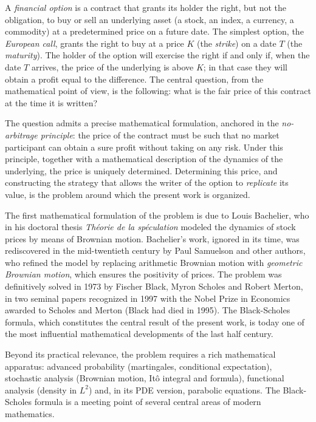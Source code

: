 \documentclass[11pt,a4paper,oneside]{report}
\theoremstyle{plain}
\theoremstyle{definition}
\theoremstyle{remark}
\newcommand{\1}{\mathbf{1}}
\begin{document}
A \emph{financial option} is a contract that grants its holder the
right, but not the obligation, to buy or sell an underlying asset (a
stock, an index, a currency, a commodity) at a predetermined price on
a future date. The simplest option, the \emph{European call}, grants
the right to buy at a price $K$ (the \emph{strike}) on a date $T$
(the \emph{maturity}). The holder of the option will exercise the
right if and only if, when the date $T$ arrives, the price of the
underlying is above $K$; in that case they will obtain a profit equal
to the difference. The central question, from the mathematical point
of view, is the following: what is the fair price of this contract at
the time it is written?

The question admits a precise mathematical formulation, anchored in
the \emph{no-arbitrage principle}: the price of the contract must be
such that no market participant can obtain a sure profit without
taking on any risk. Under this principle, together with a
mathematical description of the dynamics of the underlying, the price
is uniquely determined. Determining this price, and constructing the
strategy that allows the writer of the option to \emph{replicate} its
value, is the problem around which the present work is organized.

The first mathematical formulation
of the problem is due to Louis Bachelier, who in his doctoral thesis
\emph{Théorie de la spéculation} \cite{bachelier} modeled the
dynamics of stock prices by means of Brownian motion. Bachelier's
work, ignored in its time, was rediscovered in the mid-twentieth
century by Paul Samuelson and other authors, who refined the model by
replacing arithmetic Brownian motion with \emph{geometric Brownian
motion}, which ensures the positivity of prices. The problem was
definitively solved in 1973 by Fischer Black, Myron Scholes and
Robert Merton, in two seminal papers \cite{black-scholes,merton}
recognized in 1997 with the Nobel Prize in Economics awarded to
Scholes and Merton (Black had died in 1995). The Black-Scholes
formula, which constitutes the central result of the present work, is
today one of the most influential mathematical developments of the
last half century.

Beyond its
practical relevance, the problem requires a rich mathematical
apparatus: advanced probability (martingales, conditional
expectation), stochastic analysis (Brownian motion, Itô integral and
formula), functional analysis (density in $L^2$) and, in its PDE
version, parabolic equations. The Black-Scholes formula is a meeting
point of several central areas of modern mathematics.
\end{document}
